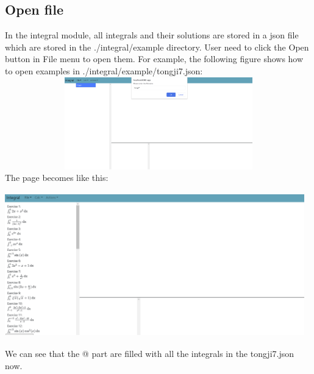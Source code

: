 \documentclass[titlepage]{article}
\makeatletter
\newcommand*{\rom}[1]{\expandafter\@slowromancap\romannumeral #1@}
\makeatother
\begin{document}
\subsection{Open file}
In the integral module, all integrals and their solutions are stored in a json file which are stored in the ./integral/example directory. User need to click the \colorbox{mygray}{Open} button in File menu to open them. For example, the following figure shows how to open examples in ./integral/example/tongji7.json:\\
\includegraphics[width=14.5cm, height=4cm]{3.png}
The page becomes like this:\\
\includegraphics[width=13cm, height=7cm]{4.png}
We can see that the \rom{2} part are filled with all the integrals in the tongji7.json now.\\
\end{document}
